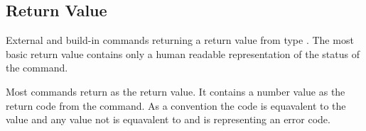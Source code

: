 \subsection{Return Value}

External and build-in commands returning a return value from type
. The most basic return value contains only a human readable
representation of the status of the command.

Most commands return  as the return value. It contains a number
value as the return code from the command. As a convention the
code  is equavalent to the value  and any value not 
is equavalent to  and is representing an error code.
